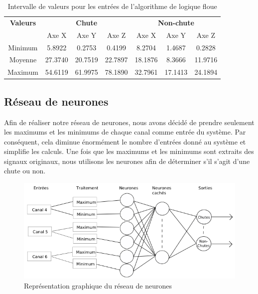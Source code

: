\documentclass[12pt,letterpaper]{article}
\begin{document}
\begin{table}[h]
  \begin{center}
    \begin{tabular} {|c|c|c|c|c|c|c|}
        \hline
        \textbf{Valeurs} & \multicolumn{3}{|c|}{\textbf{Chute}} & \multicolumn{3}{|c|}{\textbf{Non-chute}} \\ \cline{2-7}
         & Axe X & Axe Y & Axe Z & Axe X & Axe Y & Axe Z \\
        \hline
        Minimum & 5.8922  & 0.2753  & 0.4199  & 8.2704  & 1.4687  & 0.2828 \\
        \hline
        Moyenne & 27.3740 & 20.7519 & 22.7897 & 18.1876 & 8.3666  & 11.9716 \\
        \hline
        Maximum & 54.6119 & 61.9975 & 78.1890 & 32.7961 & 17.1413 & 24.1894 \\
        \hline
    \end{tabular}
    \caption{Intervalle de valeurs pour les entrées de l'algorithme de logique floue}
    \label{tbl:f_input_val}
  \end{center}
\end{table}

\subsection{Réseau de neurones} %

Afin de réaliser notre réseau de neurones, nous avons décidé de prendre seulement les maximums et les minimums de chaque canal comme entrée du système. Par conséquent, cela diminue énormément le nombre d'entrées donné au système et simplifie les calculs. Une fois que les maximums et les minimums sont extraits des signaux originaux, nous utilisons les neurones afin de déterminer s'il s'agit d'une chute ou non.

\begin{figure}
\centering
\includegraphics[scale=0.75]{images/NN.png}
\caption{Représentation graphique du réseau de neurones}
\label{fig:NN}
\end{figure}
\end{document}
